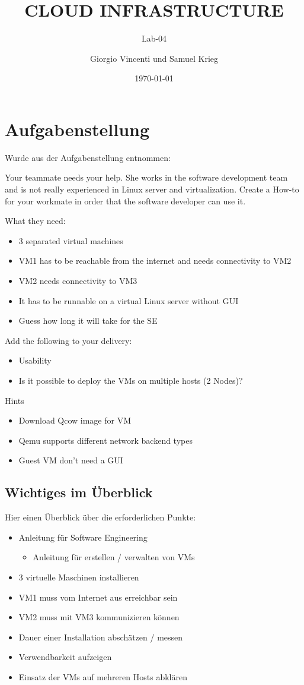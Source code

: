 \documentclass[a4,12pt]{scrartcl}
\title{CLOUD INFRASTRUCTURE}
\subtitle{Lab-04}
\author{Giorgio Vincenti und Samuel Krieg}
\date{\today}
\begin{document}
\clearpage\maketitle
\thispagestyle{empty}
\tableofcontents

\section{Aufgabenstellung}
Wurde aus der Aufgabenstellung entnommen:

Your teammate needs your help. She works in the software development team and is not really experienced in Linux server and virtualization. Create a How-to for your workmate in order that the software developer can use it.

What they need:
\begin{itemize}
\item 3 separated virtual machines
\item  VM1 has to be reachable from the internet and needs connectivity to VM2
\item VM2 needs connectivity to VM3
\item It has to be runnable on a virtual Linux server without GUI
\item Guess how long it will take for the SE
\end{itemize}

Add the following to your delivery:
\begin{itemize}
\item Usability
\item Is it possible to deploy the VMs on multiple hosts (2 Nodes)?
\end{itemize}

Hints
\begin{itemize}
\item Download Qcow image for VM
\item Qemu supports different network backend types
\item Guest VM don’t need a GUI
\end{itemize}


\subsection{Wichtiges im Überblick}
Hier einen Überblick über die erforderlichen Punkte:
\begin{itemize}
\item Anleitung für Software Engineering 
\begin{itemize}
\item Anleitung für erstellen / verwalten von VMs
\end{itemize}
\item 3 virtuelle Maschinen installieren
\item VM1 muss vom Internet aus erreichbar sein
\item VM2 muss mit VM3 kommunizieren können
\item Dauer einer Installation abschätzen / messen
\item Verwendbarkeit aufzeigen
\item Einsatz der VMs auf mehreren Hosts abklären
\end{itemize}
\end{document}
